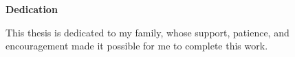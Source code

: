 \begin{titlepage}
    \vspace*{28pt}
    \vspace{10pt}

    \begin{center}
        {\fontsize{16}{20}\selectfont \textbf{Dedication}}
    \end{center}

    \vspace{14pt}
    \vspace{10pt}

    {\fontsize{12}{18}\selectfont
    \noindent\hspace*{4ex}%
    This thesis is dedicated to my family, whose support, patience, and encouragement made it possible for me to complete this work.
    }

\end{titlepage}
